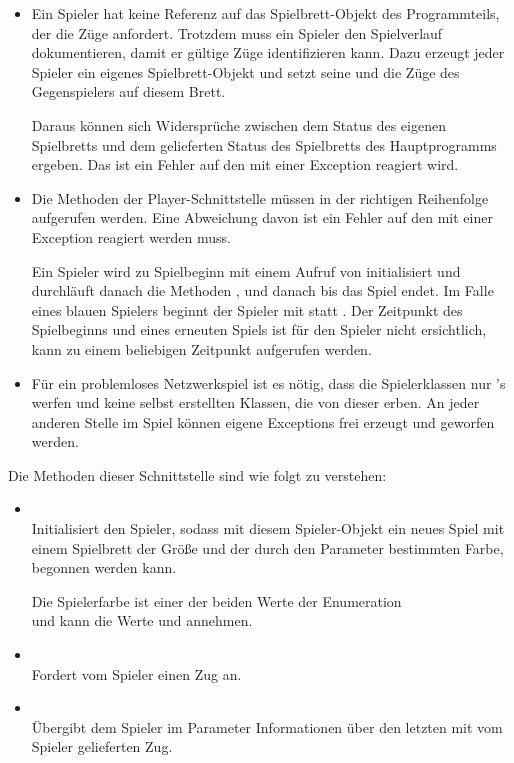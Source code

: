 \begin{enumerate}
\begin{itemize}
\item Ein Spieler hat keine Referenz auf das Spielbrett-Objekt des Programmteils, der die Züge anfordert. Trotzdem muss ein Spieler den Spielverlauf dokumentieren, damit er gültige Züge identifizieren kann. Dazu erzeugt jeder Spieler ein eigenes Spielbrett-Objekt und setzt seine und die Züge des Gegenspielers auf diesem Brett.

Daraus können sich Widersprüche zwischen dem Status des eigenen Spielbretts und dem gelieferten Status des Spielbretts des Hauptprogramms ergeben. Das ist ein Fehler auf den mit einer Exception reagiert wird.

\item Die Methoden der Player-Schnittstelle müssen in der richtigen Reihenfolge aufgerufen werden. Eine Abweichung davon ist ein Fehler auf den mit einer Exception reagiert werden muss.

Ein Spieler wird zu Spielbeginn mit einem Aufruf von  initialisiert und durchläuft danach die Methoden ,  und danach  bis das Spiel endet. Im Falle eines blauen Spielers beginnt der Spieler mit  statt . Der Zeitpunkt des Spielbeginns und eines erneuten Spiels ist für den Spieler nicht ersichtlich,  kann zu einem beliebigen Zeitpunkt aufgerufen werden.

\item Für ein problemloses Netzwerkspiel ist es nötig, dass die Spielerklassen nur 's werfen und keine selbst erstellten Klassen, die von dieser erben. An jeder anderen Stelle im Spiel können eigene Exceptions frei erzeugt und geworfen werden.
\end{itemize}

Die Methoden dieser Schnittstelle sind wie folgt zu verstehen:

\begin{itemize}[leftmargin=4em]
\item[\code{init}] \hfill \\Initialisiert den Spieler, sodass mit diesem Spieler-Objekt ein neues Spiel mit einem Spielbrett der Größe  und der durch den Parameter  bestimmten Farbe, begonnen werden kann.

Die Spielerfarbe ist einer der beiden Werte der Enumeration \\
 und kann die Werte  und  annehmen.
\item[\code{request}] \hfill \\Fordert vom Spieler einen Zug an.
\item[\code{confirm}] \hfill \\Übergibt dem Spieler im Parameter  Informationen über den letzten mit  vom Spieler gelieferten Zug.


\end{itemize}
\end{enumerate}
